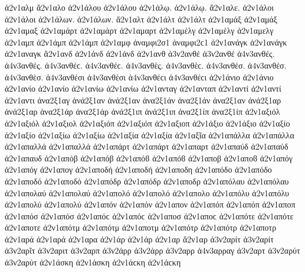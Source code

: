 {ἀ2ν1αλμ
ἄ2ν1αλο   %
ἀ2ν1άλου ἀ2ν1άλου
ἀ2ν1άλῳ. ἀ2ν1άλῳ.
ἄ2ν1αλε.
ἀ2ν1άλοι ἀ2ν1άλοι
ἀ2ν1άλων. ἀ2ν1άλων.
ἄ2ν1αλτ   %
ἀ2ν1άλτ ἀ2ν1άλτ
ἀ2ν1αμάξ ἀ2ν1αμάξ   %
ἀ2ν1αμαξ
ἀ2ν1αμάρτ ἀ2ν1αμάρτ   %
ἀ2ν1αμαρτ
ἀ2ν1αμέλγ ἀ2ν1αμέλγ   %
ἀ2ν1αμελγ
ἀ2ν1αμπ   %
ἀ2ν1άμπ ἀ2ν1άμπ   %
ἀ2ν1αμφ   %
ἀναμφι2σ1 ἀναμφι2ϲ1   %
ἀ2ν1ανάγκ ἀ2ν1ανάγκ   %
ἀ2ν1αναγκ
ἄ2ν1ανδ   %
ἀ2ν1άνδ ἀ2ν1άνδ
ἀ2ν1ανθ   %
ἀ3ν2ανθέ ἀ3ν2ανθέ   %
ἀ4ν3ανθές. ἀ4ν3ανθές. ἀ4ν3ανθέϲ. ἀ4ν3ανθέϲ.   %
ἀ4ν3ανθὲς. ἀ4ν3ανθὲϲ.
ἀ4ν3ανθέσ. ἀ4ν3ανθέσ.
ἀ4ν3ανθὲσ.
ἀ4ν3ανθέσι ἀ4ν3ανθέσι ἀ4ν3ανθέϲι ἀ4ν3ανθέϲι
ἀ2ν1άνιο ἀ2ν1άνιο   %
ἀ2ν1ανίο ἀ2ν1ανίο
ἀ2ν1ανίω ἀ2ν1ανίω
ἀ2ν1ανταγ   %
ἀ2ν1ανταπ   %
ἀ2ν1αντί ἀ2ν1αντί   %
ἀ2ν1αντι
ἀνα2ξ1αγ   %
ἀνά2ξ1αν ἀνά2ξ1αν   %
ἀνα2ξ1άν ἀνα2ξ1άν
ἀνα2ξ1αν   %
ἀνά2ξ1αρ ἀνά2ξ1αρ   %
ἀνα2ξ1άρ ἀνα2ξ1άρ
ἀνά2ξ1ιπ ἀνά2ξ1ιπ   %
ἀνα2ξ1ίπ ἀνα2ξ1ίπ
ἀ2ν1αξιόλ ἀ2ν1αξιόλ   %
ἀ2ν1αξιολ
ἀ2ν1αξιόπ ἀ2ν1αξιόπ   %
ἀ2ν1αξιοπ
ἀ2ν1άξιο ἀ2ν1άξιο   %
ἀ2ν1αξίο ἀ2ν1αξίο
ἀ2ν1αξίω ἀ2ν1αξίω
ἀ2ν1αξία ἀ2ν1αξία
ἀ2ν1αξῖα
ἀ2ν1απάλλα ἀ2ν1απάλλα   %
ἀ2ν1απαλλά ἀ2ν1απαλλά
ἀ2ν1απάρτ ἀ2ν1απάρτ   %
ἀ2ν1απαρτ
ἀ2ν1απαύδ ἀ2ν1απαύδ   %
ἀ2ν1απαυδ
ἀ2ν1απόβ ἀ2ν1απόβ ἀ2ν1απόϐ ἀ2ν1απόϐ %
ἀ2ν1αποβ ἀ2ν1αποϐ
ἀ2ν1απόγ ἀ2ν1απόγ   %
ἀ2ν1απογ
ἀ2ν1αποδή ἀ2ν1αποδή   %
ἀ2ν1αποδη
ἀ2ν1απόδο ἀ2ν1απόδο   %
ἀ2ν1αποδό ἀ2ν1αποδό
ἀ2ν1απόδρ ἀ2ν1απόδρ   %
ἀ2ν1αποδρ
ἀ2ν1απόλαυ ἀ2ν1απόλαυ   %
ἀ2ν1απολαύ ἀ2ν1απολαύ
ἀ2ν1απολό ἀ2ν1απολό   %
ἀ2ν1απολο
ἀ2ν1απόλυ ἀ2ν1απόλυ   %
ἀ2ν1απολύ ἀ2ν1απολύ
ἀ2ν1απόν ἀ2ν1απόν   %
ἀ2ν1απον
ἀ2ν1απόπ ἀ2ν1απόπ   %
ἀ2ν1αποπ
ἀ2ν1απόσ ἀ2ν1απόσ ἀ2ν1απόϲ ἀ2ν1απόϲ   %
ἀ2ν1αποσ ἀ2ν1αποϲ
ἀ2ν1απότε ἀ2ν1απότε   %
ἀ2ν1αποτε
ἀ2ν1απότμ ἀ2ν1απότμ   %
ἀ2ν1αποτμ
ἀ2ν1απότρ ἀ2ν1απότρ   %
ἀ2ν1αποτρ
ἀ2ν1αρά ἀ2ν1αρά   %
ἀ2ν1αρα
ἀ2ν1άρ ἀ2ν1άρ   %
ἀ2ν1αρ
ἄ2ν1αρ   %
ἀ3ν2αρίτ ἀ3ν2αρίτ   %
ἀ3ν2αρῖτ   %
ἀ3ν2αριτ   %
ἀ3ν2αρπ   %
ἀ3ν2άρρ ἀ3ν2άρρ   %
ἀ3ν2αρρ
ἀ4ν3αρραγ   %
ἀ3ν2αρτ   %
ἀ3ν2αρύτ ἀ3ν2αρύτ   %
ἀ2ν1άσκη ἀ2ν1άσκη ἀ2ν1άϲκη ἀ2ν1άϲκη   %
}
